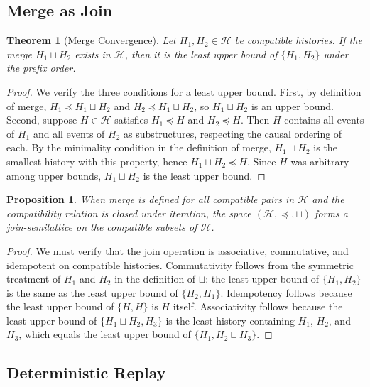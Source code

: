 \documentclass[12pt]{article}
\newtheorem{proposition}{Proposition}
\newtheorem{theorem}{Theorem}
\begin{document}
\subsection{Merge as Join}

\begin{theorem}[Merge Convergence]
\label{thm:merge}
Let $H_1, H_2 \in \mathcal{H}$ be compatible histories. If the merge $H_1 \sqcup H_2$ exists in $\mathcal{H}$, then it is the least upper bound of $\{H_1, H_2\}$ under the prefix order.
\end{theorem}

\begin{proof}
We verify the three conditions for a least upper bound. First, by definition of merge, $H_1 \preceq H_1 \sqcup H_2$ and $H_2 \preceq H_1 \sqcup H_2$, so $H_1 \sqcup H_2$ is an upper bound. Second, suppose $H \in \mathcal{H}$ satisfies $H_1 \preceq H$ and $H_2 \preceq H$. Then $H$ contains all events of $H_1$ and all events of $H_2$ as substructures, respecting the causal ordering of each. By the minimality condition in the definition of merge, $H_1 \sqcup H_2$ is the smallest history with this property, hence $H_1 \sqcup H_2 \preceq H$. Since $H$ was arbitrary among upper bounds, $H_1 \sqcup H_2$ is the least upper bound.
\end{proof}

\begin{proposition}
\label{prop:semilattice}
When merge is defined for all compatible pairs in $\mathcal{H}$ and the compatibility relation is closed under iteration, the space $(\mathcal{H}, \preceq, \sqcup)$ forms a join-semilattice on the compatible subsets of $\mathcal{H}$.
\end{proposition}

\begin{proof}
We must verify that the join operation is associative, commutative, and idempotent on compatible histories. Commutativity follows from the symmetric treatment of $H_1$ and $H_2$ in the definition of $\sqcup$: the least upper bound of $\{H_1, H_2\}$ is the same as the least upper bound of $\{H_2, H_1\}$. Idempotency follows because the least upper bound of $\{H, H\}$ is $H$ itself. Associativity follows because the least upper bound of $\{H_1 \sqcup H_2, H_3\}$ is the least history containing $H_1$, $H_2$, and $H_3$, which equals the least upper bound of $\{H_1, H_2 \sqcup H_3\}$.
\end{proof}

\subsection{Deterministic Replay}
\end{document}
